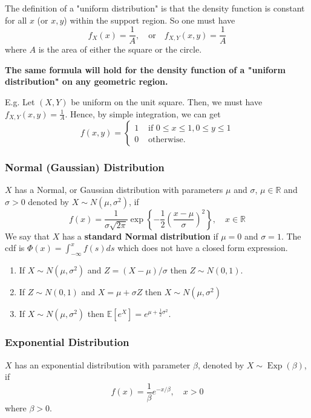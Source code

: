 \documentclass[13pt]{article}
\theoremstyle{definition}
\theoremstyle{remark}
\newenvironment{remark}
  {\pushQED{\qed}\renewcommand{\qedsymbol}{$\triangle$}\remarkx}
  {\popQED\endremarkx}
\newcommand{\EE}{\mathbb{E}}
\begin{document}
\begin{remark}
    The definition of a "uniform distribution" is that the density function is constant for all $x$ (or $x, y$) within the support region. So one must have
    \[
    f_{X}(x) = \frac{1}{A}, \quad \text{or} \quad f_{X,Y}(x,y) = \frac{1}{A}
    \]
    where $A$ is the area of either the square or the circle.

\textbf{The same formula will hold for the density function of a "uniform distribution" on any geometric region.}

E.g. Let $(X, Y)$ be uniform on the unit square. Then, we must have  $f_{X,Y}(x,y) = \frac{1}{A}$. Hence, by simple integration, we can get
$$
f(x, y)= \begin{cases}1 & \text { if } 0 \leq x \leq 1,0 \leq y \leq 1 \\ 0 & \text { otherwise. }\end{cases}
$$
\end{remark}
\subsubsection{Normal (Gaussian) Distribution} $X$ has a Normal, or Gaussian distribution with parameters $\mu$ and $\sigma$, $\mu \in \mathbb{R}$ and $\sigma>0$ denoted by $X \sim N\left(\mu, \sigma^{2}\right)$, if
\[
f(x)=\frac{1}{\sigma \sqrt{2 \pi}} \exp \left\{-\frac{1}{2}\left(\frac{x-\mu}{\sigma}\right)^{2}\right\}, \quad x \in \mathbb{R}
\]
We say that $X$ has a \textbf{standard Normal distribution} if $\mu=0$ and $\sigma=1$. The cdf is $\Phi(x)=\int_{-\infty}^{x} f(s) d s$ which does not have a closed form expression. 
\begin{remark}\hfill
    \begin{enumerate}
        \item If $X \sim N\left(\mu, \sigma^{2}\right)$ and $Z=(X-\mu) / \sigma$ then $Z \sim N(0,1)$.
        \item If $Z \sim N(0,1)$ and $X=\mu+\sigma Z$ then $X \sim N\left(\mu, \sigma^{2}\right)$
        \item If $X \sim N\left(\mu, \sigma^{2}\right)$ then $\EE[e^X]=e^{\mu+\frac{1}{2}\sigma^2}$.
    \end{enumerate}
\end{remark}

\subsubsection{Exponential Distribution} $X$ has an exponential distribution with parameter $\beta$, denoted by $X \sim \operatorname{Exp}(\beta)$, if
\[
f(x)=\frac{1}{\beta} e^{-x / \beta}, \quad x>0
\]
where $\beta>0$.
\end{document}
